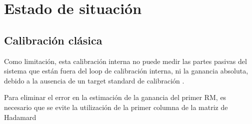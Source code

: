 \chapter{Estado de situación}
\label{ch:convertidores}

\section{Calibración clásica}

Como limitación, esta calibración interna no puede medir las partes pasivas del sistema que están fuera del loop de 
calibración interna, ni la ganancia absoluta, debido a la ausencia de un target standard de calibración \cite{Wang2010}.




Para eliminar el error en la estimación de la ganancia del primer RM, es necesario que se evite la utilización de la 
primer columna de la matriz de Hadamard \cite{Wang2010}



